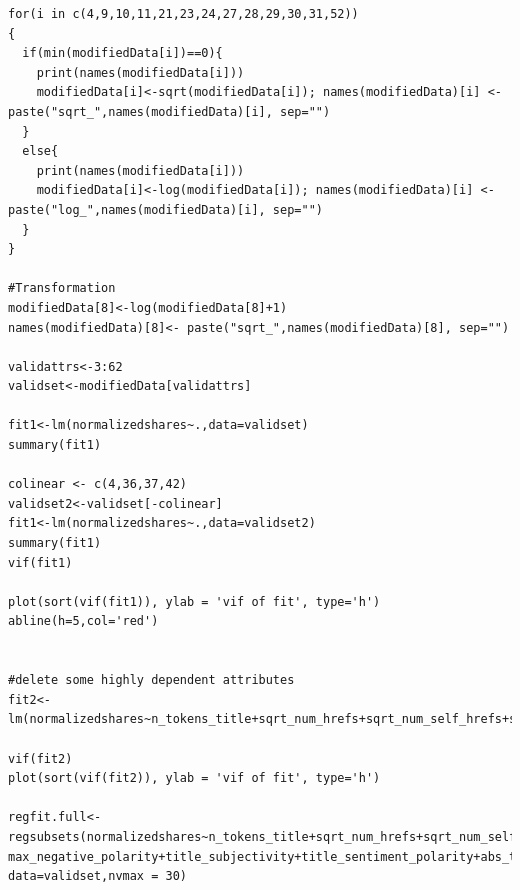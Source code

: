 \documentclass[letterpaper,12pt]{article}
\begin{document}
\begin{lstlisting}
for(i in c(4,9,10,11,21,23,24,27,28,29,30,31,52))
{
  if(min(modifiedData[i])==0){
    print(names(modifiedData[i]))
    modifiedData[i]<-sqrt(modifiedData[i]); names(modifiedData)[i] <- paste("sqrt_",names(modifiedData)[i], sep="")
  }
  else{
    print(names(modifiedData[i]))
    modifiedData[i]<-log(modifiedData[i]); names(modifiedData)[i] <- paste("log_",names(modifiedData)[i], sep="")
  } 
}

#Transformation
modifiedData[8]<-log(modifiedData[8]+1)
names(modifiedData)[8]<- paste("sqrt_",names(modifiedData)[8], sep="")

validattrs<-3:62
validset<-modifiedData[validattrs]

fit1<-lm(normalizedshares~.,data=validset)
summary(fit1)

colinear <- c(4,36,37,42)
validset2<-validset[-colinear]
fit1<-lm(normalizedshares~.,data=validset2)
summary(fit1)
vif(fit1)

plot(sort(vif(fit1)), ylab = 'vif of fit', type='h')
abline(h=5,col='red')


#delete some highly dependent attributes
fit2<-lm(normalizedshares~n_tokens_title+sqrt_num_hrefs+sqrt_num_self_hrefs+sqrt_num_imgs+sqrt_num_videos+average_token_length+num_keywords+data_channel_is_lifestyle+data_channel_is_entertainment+data_channel_is_socmed+kw_min_min+sqrt_kw_max_min+kw_avg_min+sqrt_kw_min_max+sqrt_kw_max_max+kw_avg_max+kw_min_avg+weekday_is_monday+weekday_is_tuesday+weekday_is_wednesday+weekday_is_thursday+weekday_is_friday+weekday_is_saturday+LDA_00+LDA_01+LDA_02+LDA_04+global_subjectivity+global_rate_positive_words+avg_positive_polarity+sqrt_min_positive_polarity+max_positive_polarity+min_negative_polarity+max_negative_polarity+title_subjectivity+title_sentiment_polarity+abs_title_subjectivity+abs_title_sentiment_polarity)

vif(fit2)
plot(sort(vif(fit2)), ylab = 'vif of fit', type='h')

regfit.full<-regsubsets(normalizedshares~n_tokens_title+sqrt_num_hrefs+sqrt_num_self_hrefs+sqrt_num_imgs+sqrt_num_videos+average_token_length+num_keywords+data_channel_is_lifestyle+data_channel_is_entertainment+data_channel_is_socmed+kw_min_min+sqrt_kw_max_min+kw_avg_min+sqrt_kw_min_max+sqrt_kw_max_max+kw_avg_max+kw_min_avg+weekday_is_monday+weekday_is_tuesday+weekday_is_wednesday+weekday_is_thursday+weekday_is_friday+weekday_is_saturday+LDA_00+LDA_01+LDA_02+LDA_04+global_subjectivity+global_rate_positive_words+avg_positive_polarity+sqrt_min_positive_polarity+max_positive_polarity+min_negative_polarity+ max_negative_polarity+title_subjectivity+title_sentiment_polarity+abs_title_subjectivity+abs_title_sentiment_polarity, data=validset,nvmax = 30)


\end{lstlisting}
\end{document}
